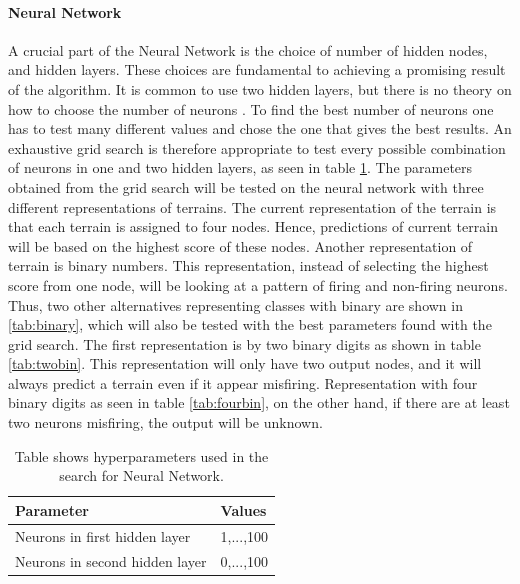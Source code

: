 \documentclass[USenglish]{ifimaster}  %
\begin{document}
\paragraph{Neural Network}
A crucial part of the Neural Network is the choice of number of hidden nodes, and hidden layers. These choices are fundamental to achieving a promising result of the algorithm. It is common to use two hidden layers, but there is no theory on how to choose the number of neurons \cite{Marsland:2009:MLA:1571643}. To find the best number of neurons one has to test many different values and chose the one that gives the best results. An exhaustive grid search is therefore appropriate to test every possible combination of neurons in one and two hidden layers, as seen in table \ref{tab:hypnn}. The parameters obtained from the grid search will be tested on the neural network with three different representations of terrains. The current representation of the terrain is that each terrain is assigned to four nodes. Hence, predictions of current terrain will be based on the highest score of these nodes. Another representation of terrain is binary numbers. This representation, instead of selecting the highest score from one node, will be looking at a pattern of firing and non-firing neurons. Thus, two other alternatives representing classes with binary are shown in \ref{tab:binary}, which will also be tested with the best parameters found with the grid search. The first representation is by two binary digits as shown in table \ref{tab:twobin}. This representation will only have two output nodes, and it will always predict a terrain even if it appear misfiring. Representation with four binary digits as seen in table \ref{tab:fourbin}, on the other hand, if there are at least two neurons misfiring, the output will be unknown.


\begin{table}[h]
	\centering
	\begin{tabular}{@{}ll@{}}
		\toprule
		\textbf{Parameter}             & \textbf{Values} \\ \midrule
		Neurons in first hidden layer  & 1,...,100       \\
		Neurons in second hidden layer & 0,...,100       \\ \bottomrule
	\end{tabular}
	\caption{Table shows hyperparameters used in the search for Neural Network.}
	\label{tab:hypnn}
\end{table}
\FloatBarrier
\end{document}
